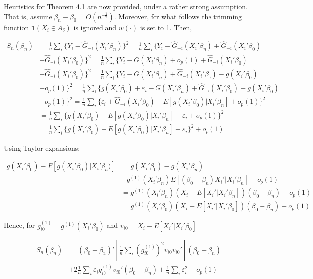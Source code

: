 \documentclass[a4paper]{article}
\begin{document}
Heuristics for Theorem 4.1 are now provided, under a rather strong assumption. That is, assume $\beta_n - \beta_0 = O(n^{-\frac{1}{2}})$. Moreover, for what follows the trimming function $\mathbf{1}(X_i \in A_\delta)$ is ignored and $w(\cdot)$ is set to 1. Then, 


\begin{align*}
S_{n}(\beta_n) & = \frac{1}{n}\sum_i \{ Y_i - \hat{G}_{-i}(X_i'\beta_n)\}^2 = \frac{1}{n}\sum_i\{Y_i - \hat{G}_{-i}(X_i'\beta_n) +  \hat{G}_{-i}(X_i'\beta_0) \\
			   & - \hat{G}_{-i}(X_i'\beta_0) \}^2 = \frac{1}{n} \sum_i \{Y_i - G(X_i'\beta_n) + o_p(1) + \hat{G}_{-i}(X_i'\beta_0) \\
			   & - \hat{G}_{-i}(X_i'\beta_0) \}^2 = \frac{1}{n}\sum_i \{ Y_i - G(X_i'\beta_n) + \hat{G}_{-i}(X_i'\beta_0) - g(X_i'\beta_0) \\
			   &  + o_p(1) \}^2 = \frac{1}{n} \sum_i \{ g(X_i'\beta_0) + \varepsilon_i - G(X_i'\beta_n) + \hat{G}_{-i}(X_i'\beta_0) - g(X_i'\beta_0)\\
			   & + o_p(1) \}^2 = \frac{1}{n} \sum_i \{ \varepsilon_i + \hat{G}_{-i}(X_i'\beta_0) - E[g(X_i'\beta_0)|X_i'\beta_n]  + o_p(1) \}^2 \\
			   &= \frac{1}{n}\sum_i \{ g(X_i'\beta_0) - E[g(X_i'\beta_0)|X_i'\beta_n] +  \varepsilon_i + o_p(1)\}^2 \\
			 & = \frac{1}{n}\sum_i \{ g(X_i'\beta_0) - E[g(X_i'\beta_0)|X_i'\beta_n] +  \varepsilon_i\}^2 + o_p(1)
\end{align*}

Using Taylor expansions:

\begin{align*}
g(X_i'\beta_0) - E[g(X_i'\beta_0)|X_i'\beta_n)] & = g(X_i'\beta_0) - g(X_i'\beta_n) \\
											 & - g^{(1)}(X_i'\beta_n)E[(\beta_0 - \beta_n)X_i'|X_i'\beta_n] + o_p(1) \\
				                              & = g^{(1)}(X_i'\beta_n)( X_i - E[X_i'|X_i'\beta_n])(\beta_0 - \beta_n) + o_p(1) \\
				                              & = g^{(1)}(X_i'\beta_0)( X_i - E[X_i'|X_i'\beta_0])(\beta_0 - \beta_n) + o_p(1)
\end{align*}


Hence, for $g_{i0}^{(1)} = g^{(1)}(X_i'\beta_0)$ and $v_{i0} = X_i - E[X_i'|X_i'\beta_0]$
 
\begin{align*}
S_{n}(\beta_n) & = (\beta_0 - \beta_n)'\left[\frac{1}{n}\sum_i (g_{i0}^{(1)})^2v_{i0}v_{i0}'\right](\beta_0 - \beta_n) \\
             & + 2\frac{1}{n}\sum_i\varepsilon_ig_{i0}^{(1)}v_{i0}'(\beta_0 - \beta_n) + \frac{1}{n}\sum_i \varepsilon_i^2 + o_p(1)
\end{align*}
\end{document}
